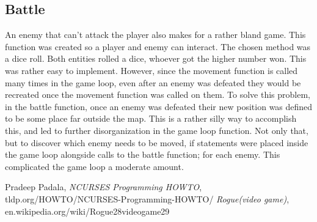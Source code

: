 \documentclass[11pt]{article}
\begin{document}
\subsection{Battle}
An enemy that can’t attack the player also makes for a rather bland game.  This function was created so a player and enemy can interact.  The chosen method was a dice roll.  Both entities rolled a dice, whoever got the higher number won.  This was rather easy to implement. However, since the movement function is called many times in the game loop, even after an enemy was defeated they would be recreated once the movement function was called on them. To solve this problem, in the battle function, once an enemy was defeated their new position was defined to be some place far outside the map.  This is a rather silly way to accomplish this, and led to further disorganization in the game loop function.  Not only that, but to discover which enemy needs to be moved, if statements were placed inside the game loop alongside calls to the battle function; for each enemy.  This complicated the game loop a moderate amount. 

\begin{thebibliography}{2}
Pradeep Padala,
\emph{NCURSES Programming HOWTO},
 tldp.org/HOWTO/NCURSES-Programming-HOWTO/
\emph{Rogue(video game)},
en.wikipedia.org/wiki/Rogue28videogame29
\end{thebibliography}  
\end{document}
